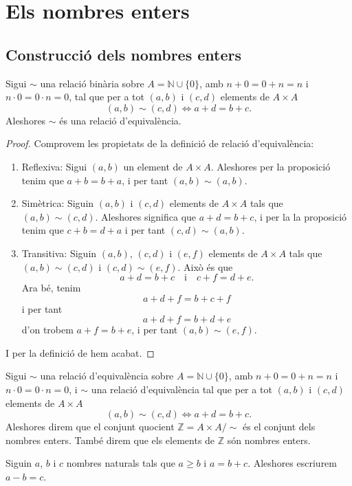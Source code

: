 \documentclass[../Apunts.tex]{subfiles}
\begin{document}
	\section{Els nombres enters}
	\subsection{Construcció dels nombres enters}
	\begin{proposition}
		Sigui \(\sim\) una relació binària sobre \(A=\mathbb{N}\cup\{0\}\), amb \(n+0=0+n=n\) i \(n\cdot 0=0\cdot n=0\), tal que per a tot \((a,b)\) i \((c,d)\) elements de \(A\times A\)
		\[(a,b)\sim(c,d)\Longleftrightarrow a+d=b+c.\]
		Aleshores \(\sim\) és una relació d'equivalència.
		\begin{proof}
			Comprovem les propietats de la definició de relació d'equivalència:
			\begin{enumerate}
				\item Reflexiva: Sigui \((a,b)\) un element de \(A\times A\). Aleshores per la proposició  tenim que \(a+b=b+a\), i per tant \((a,b)\sim(a,b)\).
				\item Simètrica: Siguin \((a,b)\) i \((c,d)\) elements de \(A\times A\) tals que \((a,b)\sim(c,d)\). Aleshores significa que \(a+d=b+c\), i per la la proposició  tenim que \(c+b=d+a\) i per tant \((c,d)\sim(a,b)\).
				\item Transitiva: Siguin \((a,b)\), \((c,d)\) i \((e,f)\) elements de \(A\times A\) tals que \((a,b)\sim(c,d)\) i \((c,d)\sim(e,f)\). Això és que
				\[a+d=b+c\quad\text{i}\quad c+f=d+e.\]
				Ara bé, tenim
				\[a+d+f=b+c+f\]
				i per tant
				\[a+d+f=b+d+e\]
				d'on trobem \(a+f=b+e\), i per tant \((a,b)\sim(e,f)\).
			\end{enumerate}
			I per la definició de  hem acabat.
		\end{proof}
	\end{proposition}
	\begin{definition}
		\label{def:nombres enters}
		Sigui \(\sim\) una relació d'equivalència sobre \(A=\mathbb{N}\cup\{0\}\), amb \(n+0=0+n=n\) i \(n\cdot 0=0\cdot n=0\), i \(\sim\) una relació d'equivalència tal que per a tot \((a,b)\) i \((c,d)\) elements de \(A\times A\)
		\[(a,b)\sim(c,d)\Longleftrightarrow a+d=b+c.\]
		Aleshores direm que el conjunt quocient \(\mathbb{Z}=A\times A/\sim\) és el conjunt dels nombres enters. També direm que els elements de \(\mathbb{Z}\) són nombres enters.
	\end{definition}
	\begin{definition}
		\label{def:resta de nombres naturals}
		Siguin \(a\), \(b\) i \(c\) nombres naturals tals que \(a\geq b\) i \(a=b+c\). Aleshores escriurem \(a-b=c\).
	\end{definition}
\end{document}

